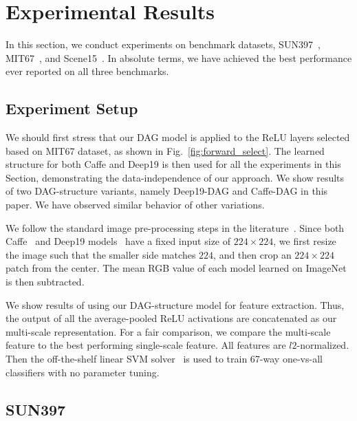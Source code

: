 \documentclass[10pt,twocolumn,letterpaper]{article}
\begin{document}
\section{Experimental Results\label{sec:exp}}

In this section, we conduct experiments on benchmark datasets, SUN397~\cite{SUN397}, MIT67~\cite{MIT67}, and Scene15~\cite{Scene15}. In absolute terms, we have achieved the best performance ever reported on all three benchmarks. 

\subsection{Experiment Setup}

We should first stress that our DAG model is applied to the ReLU layers selected based on MIT67 dataset, as shown in Fig.~\ref{fig:forward_select}. The learned structure for both Caffe and Deep19 is then used for all the experiments in this Section, demonstrating the data-independence of our approach. We show results of two DAG-structure variants, namely Deep19-DAG and Caffe-DAG in this paper. We have observed similar behavior of other variations.

We follow the standard image pre-processing steps in the literature~\cite{AlexNet,Caffe,veryDeep}. Since both Caffe~\cite{Caffe} and Deep19 models~\cite{veryDeep} have a fixed input size of $224\times 224$, we first resize the image such that the smaller side matches $224$, and then crop an $224\times 224$ patch from the center. The mean RGB value of each model learned on ImageNet~\cite{ImageNet} is then subtracted.  

We show results of using our DAG-structure model for feature extraction. Thus, the output of all the average-pooled ReLU activations are concatenated as our multi-scale representation. For a fair comparison, we compare the multi-scale feature to the best performing single-scale feature. All features are $l2$-normalized. Then the off-the-shelf linear SVM solver~\cite{liblinear} is used to train 67-way one-vs-all classifiers with no parameter tuning.


\subsection{SUN397}
\end{document}
